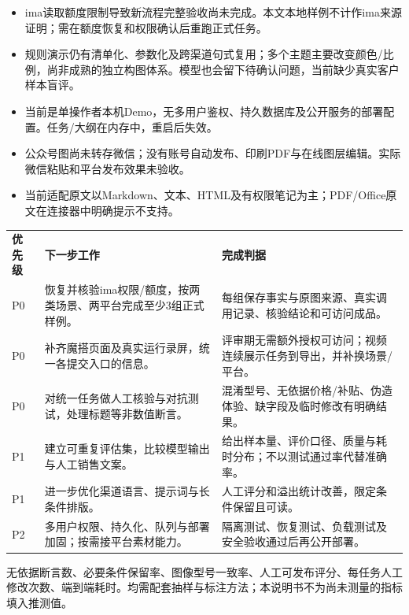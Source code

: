 \begin{itemize}
\item {}ima读取额度限制导致新流程完整验收尚未完成。本文本地样例不计作ima来源证明；需在额度恢复和权限确认后重跑正式任务。
\item {}规则演示仍有清单化、参数化及跨渠道句式复用；多个主题主要改变颜色/比例，尚非成熟的独立构图体系。模型也会留下待确认问题，当前缺少真实客户样本盲评。
\item {}当前是单操作者本机Demo，无多用户鉴权、持久数据库及公开服务的部署配置。任务/大纲在内存中，重启后失效。
\item {}公众号图尚未转存微信；没有账号自动发布、印刷PDF与在线图层编辑。实际微信粘贴和平台发布效果未验收。
\item {}当前适配原文以Markdown、文本、HTML及有权限笔记为主；PDF/Office原文在连接器中明确提示不支持。
\end{itemize}
\begingroup\small
\begin{tabularx}{\linewidth}{P{12mm}Y Y}
\color{white}\bfseries 优先级 & \color{white}\bfseries 下一步工作 & \color{white}\bfseries 完成判据\\
P0 & 恢复并核验ima权限/额度，按两类场景、两平台完成至少3组正式样例。 & 每组保存事实与原图来源、真实调用记录、核验结论和可访问成品。\\
P0 & 补齐魔搭页面及真实运行录屏，统一各提交入口的信息。 & 评审期无需额外授权可访问；视频连续展示任务到导出，并补换场景/平台。\\
P0 & 对统一任务做人工核验与对抗测试，处理标题等非数值断言。 & 混淆型号、无依据价格/补贴、伪造体验、缺字段及临时修改有明确结果。\\
P1 & 建立可重复评估集，比较模型输出与人工销售文案。 & 给出样本量、评价口径、质量与耗时分布；不以测试通过率代替准确率。\\
P1 & 进一步优化渠道语言、提示词与长条件排版。 & 人工评分和溢出统计改善，限定条件保留且可读。\\
P2 & 多用户权限、持久化、队列与部署加固；按需接平台素材能力。 & 隔离测试、恢复测试、负载测试及安全验收通过后再公开部署。\\
\bottomrule
\end{tabularx}
\endgroup
\begin{note}\small
{}\quad 无依据断言数、必要条件保留率、图像型号一致率、人工可发布评分、每任务人工修改次数、端到端耗时。均需配套抽样与标注方法；本说明书不为尚未测量的指标填入推测值。
\end{note}

